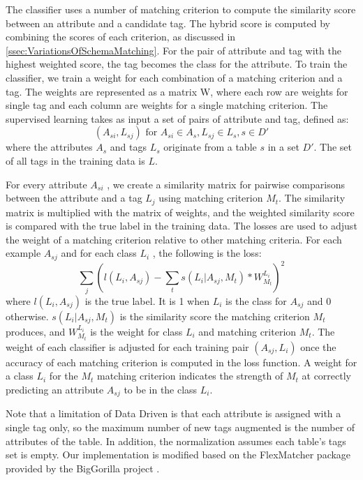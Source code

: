The classifier uses a number of matching criterion to compute the similarity score between an attribute and a candidate tag. The hybrid score is computed by combining the scores of each criterion, as discussed in \autoref{ssec:VariationsOfSchemaMatching}. For the pair of attribute and tag with the highest weighted score, the tag becomes the class for the attribute. To train the classifier, we train a weight for each combination of a matching criterion and a tag. The weights are represented as a matrix W, where each row are weights for single tag and each column are weights for a single matching criterion. The supervised learning takes as input a set of pairs of attribute and tag, defined as:
\[
(A_{si},L_{sj})\text{ for }A_{si}\in A_{s},L_{sj}\in L_{s},s\in D'
\]
where the attributes $A_s$ and tags $L_s$ originate from a table $s$ in a set ${D'}$. The set of all tags in the training data is $L$.

For every attribute $A_{si}$ , we create a similarity matrix for pairwise comparisons between the attribute and a tag $L_j$ using matching criterion $M_t$. The similarity matrix is multiplied with the matrix of weights, and the weighted similarity score is compared with the true label in the training data. The losses are used to adjust the weight of a matching criterion relative to other matching criteria. For each example $A_{sj}$ and for each class $L_i$ , the following is the loss: 
\[
\sum_{j}(l(L_{i},A_{sj})-\sum_{t}s(L_{i}|A_{sj},M_{t})\ast W_{M_{t}}^{L_{i}})^{2}
\]
where $l(L_{i},A_{sj})$ is the true label. It is 1 when $L_{i}$ is the class for $A_{sj}$ and 0 otherwise. $s(L_{i}|A_{sj},M_{t})$ is the similarity score the matching criterion $M_{t}$ produces, and $W_{M_{t}}^{L_{i}}$ is the weight for class $L_{i}$ and matching criterion $M_{t}$. The weight of each classifier is adjusted for each training pair $(A_{sj}, L_{i})$ once the accuracy of each matching criterion is computed in the loss function. A weight for a class $L_{i}$ for the $M_{t}$ matching criterion indicates the strength of $M_{t}$ at correctly predicting an attribute $A_{sj}$ to be in the class $L_{i}$.

Note that a limitation of Data Driven is that each attribute is assigned with a single tag only, so the maximum number of new tags augmented is the number of attributes of the table. In addition, the normalization assumes each table's tags set is empty. Our implementation is modified based on the FlexMatcher package provided by the BigGorilla project \cite{DBLP:journals/debu/ChenGHTD18}.

